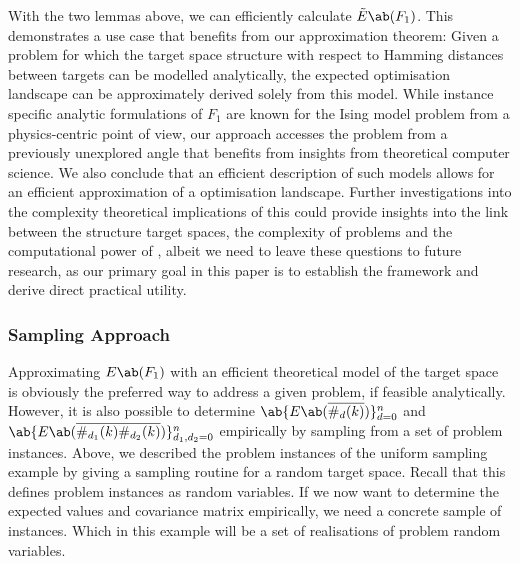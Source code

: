 With the two lemmas above, we can efficiently calculate $\tilde{E}\ab(F_1)$. This demonstrates a use case that benefits from our approximation theorem: Given a problem for which the target space structure with respect to Hamming distances between targets can be modelled analytically, the expected optimisation landscape can be approximately derived solely from this model. While instance specific analytic formulations of $F_1$ are known for the Ising model problem \cite{Ozaeta:2022} from a physics-centric
point of view, our approach accesses the problem from a previously unexplored angle 
that benefits from insights from theoretical computer science. We also conclude that an efficient description of such models allows for an efficient approximation of a \QAOA optimisation landscape. Further investigations into the complexity theoretical implications of this could provide insights into the link between the structure target spaces, the complexity of problems and the computational power of \QAOA, albeit we need to leave these questions to future research, as our primary goal in this paper is to establish the framework and derive direct practical utility.

\subsubsection{Sampling Approach}\label{sec:uniform_sampled_sampling}
Approximating $E\ab(F_1)$ with an efficient theoretical model of the target space is obviously the preferred way to address a given problem, if feasible analytically. However, it is also possible to determine $\ab\{E\ab(\overline{\#_d (k)})\}_{d=0}^n$ and $\ab\{E\ab(\overline{\#_{d_1} (k) \#_{d_2} (k)})\}_{d_1 , d_2 = 0}^n$ empirically by sampling from a set of problem instances. Above, we described the problem instances of the uniform sampling example by giving a sampling routine for a random target space. Recall that this defines problem instances as random variables. If we now want to determine the expected values and covariance matrix empirically, we need a concrete sample of instances. Which in this example will be a set of realisations of problem random variables. 

